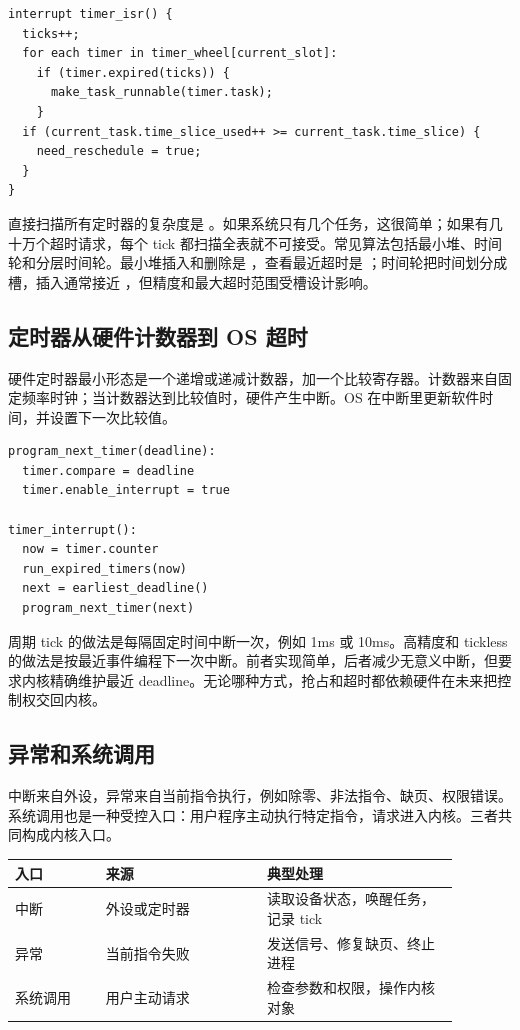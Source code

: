 \begin{lstlisting}
interrupt timer_isr() {
  ticks++;
  for each timer in timer_wheel[current_slot]:
    if (timer.expired(ticks)) {
      make_task_runnable(timer.task);
    }
  if (current_task.time_slice_used++ >= current_task.time_slice) {
    need_reschedule = true;
  }
}
\end{lstlisting}

直接扫描所有定时器的复杂度是 。如果系统只有几个任务，这很简单；如果有几十万个超时请求，每个 tick 都扫描全表就不可接受。常见算法包括最小堆、时间轮和分层时间轮。最小堆插入和删除是 ，查看最近超时是 ；时间轮把时间划分成槽，插入通常接近 ，但精度和最大超时范围受槽设计影响。

\subsection{定时器从硬件计数器到 OS 超时}

硬件定时器最小形态是一个递增或递减计数器，加一个比较寄存器。计数器来自固定频率时钟；当计数器达到比较值时，硬件产生中断。OS 在中断里更新软件时间，并设置下一次比较值。

\begin{lstlisting}
program_next_timer(deadline):
  timer.compare = deadline
  timer.enable_interrupt = true

timer_interrupt():
  now = timer.counter
  run_expired_timers(now)
  next = earliest_deadline()
  program_next_timer(next)
\end{lstlisting}

周期 tick 的做法是每隔固定时间中断一次，例如 1ms 或 10ms。高精度和 tickless 的做法是按最近事件编程下一次中断。前者实现简单，后者减少无意义中断，但要求内核精确维护最近 deadline。无论哪种方式，抢占和超时都依赖硬件在未来把控制权交回内核。

\subsection{异常和系统调用}

中断来自外设，异常来自当前指令执行，例如除零、非法指令、缺页、权限错误。系统调用也是一种受控入口：用户程序主动执行特定指令，请求进入内核。三者共同构成内核入口。

\begin{longtable}{p{0.18\linewidth}p{0.32\linewidth}p{0.38\linewidth}}
\toprule
入口 & 来源 & 典型处理 \\
\midrule
中断 & 外设或定时器 & 读取设备状态，唤醒任务，记录 tick \\
异常 & 当前指令失败 & 发送信号、修复缺页、终止进程 \\
系统调用 & 用户主动请求 & 检查参数和权限，操作内核对象 \\
\bottomrule
\end{longtable}


